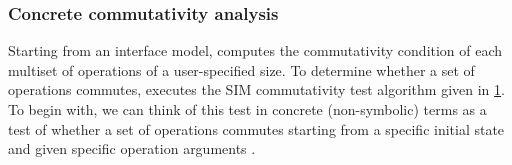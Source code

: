 \subsubsection{Concrete commutativity analysis}

Starting from an interface model, \analyzer computes the commutativity
condition of each multiset of operations of a user-specified size.
%
To determine whether a set of operations commutes, \analyzer executes
the SIM commutativity test algorithm given in \cref{fig:commutes}.  To
begin with, we can think of this test in concrete (non-symbolic) terms
as a test of whether a set of operations commutes starting from a
specific initial state  and given specific operation
arguments .

\begin{figure}
  \label{fig:commutes}
\end{figure}

%
%

